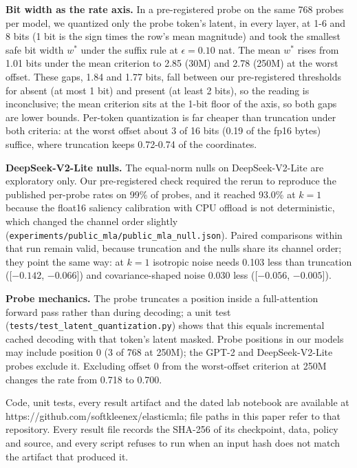 \documentclass[11pt]{article}
\begin{document}
\textbf{Bit width as the rate axis.} In a pre-registered probe on the same 768 probes per model, we quantized only the probe token's latent, in every layer, at 1-6 and 8 bits (1 bit is the sign times the row's mean magnitude) and took the smallest safe bit width $w^*$ under the suffix rule at $\epsilon=0.10$ nat. The mean $w^*$ rises from 1.01 bits under the mean criterion to 2.85 (30M) and 2.78 (250M) at the worst offset. These gaps, 1.84 and 1.77 bits, fall between our pre-registered thresholds for absent (at most 1 bit) and present (at least 2 bits), so the reading is inconclusive; the mean criterion sits at the 1-bit floor of the axis, so both gaps are lower bounds. Per-token quantization is far cheaper than truncation under both criteria: at the worst offset about 3 of 16 bits (0.19 of the fp16 bytes) suffice, where truncation keeps 0.72-0.74 of the coordinates.

\textbf{DeepSeek-V2-Lite nulls.} The equal-norm nulls on DeepSeek-V2-Lite are exploratory only. Our pre-registered check required the rerun to reproduce the published per-probe rates on 99\% of probes, and it reached 93.0\% at $k=1$ because the float16 saliency calibration with CPU offload is not deterministic, which changed the channel order slightly (\texttt{experiments/\allowbreak public\_mla/\allowbreak public\_mla\_null.json}). Paired comparisons within that run remain valid, because truncation and the nulls share its channel order; they point the same way: at $k=1$ isotropic noise needs 0.103 less than truncation ([$-0.142$, $-0.066$]) and covariance-shaped noise 0.030 less ([$-0.056$, $-0.005$]).

\textbf{Probe mechanics.} The probe truncates a position inside a full-attention forward pass rather than during decoding; a unit test (\texttt{tests/\allowbreak test\_latent\_quantization.py}) shows that this equals incremental cached decoding with that token's latent masked. Probe positions in our models may include position 0 (3 of 768 at 250M); the GPT-2 and DeepSeek-V2-Lite probes exclude it. Excluding offset 0 from the worst-offset criterion at 250M changes the rate from 0.718 to 0.700.

Code, unit tests, every result artifact and the dated lab notebook are available at https://github.com/softkleenex/elasticmla; file paths in this paper refer to that repository. Every result file records the SHA-256 of its checkpoint, data, policy and source, and every script refuses to run when an input hash does not match the artifact that produced it.
\end{document}
